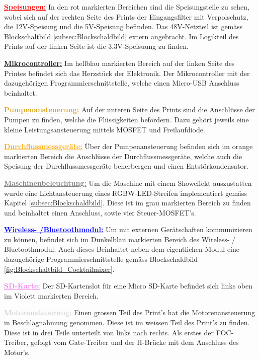 \textcolor{red}{\textbf{\underline{Speisungen:}}}
In den rot markierten Bereichen sind die Speisungsteile zu sehen, wobei sich auf der rechten Seite des Prints der Eingangsfilter mit Verpolschutz, die 12V-Speisung und die 5V-Speisung befinden. Das 48V-Netzteil ist gemäss Blockschaltbild \ref{subsec:Blockschaldbild} extern angebracht. Im Logikteil des Prints auf der linken Seite ist die 3.3V-Speisuung zu finden.

\textcolor{ProcessBlue}{\textbf{\underline{Mikrocontroller:}}}
Im hellblau markierten Bereich auf der linken Seite des Printes befindet sich das Herzstück der Elektronik. Der Mikrocontroller mit der dazugehörigen Programmierschnittstelle, welche einen Micro-USB Anschluss beinhaltet.

\textcolor{Goldenrod}{\textbf{\underline{Pumpenansteuerung:}}}
Auf der unteren Seite des Prints sind die Anschlüsse der Pumpen zu finden, welche die Flüssigkeiten befördern. Dazu gehört jeweils eine kleine Leistungsansteuerung mittels MOSFET und Freilaufdiode. 

\textcolor{orange}{\textbf{\underline{Durchflussmessgeräte:}}} Über der Pumpenansteuerung befinden sich im orange markierten Bereich die Anschlüsse der Durchflussmessgeräte, welche auch die Speisung der Durchflussmessgeräte beherbergen und einen Entstörkondensator.

\textcolor{gray}{\textbf{\underline{Maschinenbeleuchtung:}}}
Um die Maschine mit einem Showeffekt auszustatten wurde eine Lichtansteuerung eines RGBW-LED-Streifen implementiert gemäss Kapitel \ref{subsec:Blockschaldbild}. Diese ist im grau markierten Bereich zu finden und beinhaltet einen Anschluss, sowie vier Steuer-MOSFET's.

\textcolor{blue}{\textbf{\underline{Wireless- /Bluetoothmodul:}}}
Um mit externen Gerätschaften kommunizieren zu können, befindet sich im Dunkelblau markierten Bereich des Wireless- / Bluetoothmodul. Auch dieses Beinhaltet neben dem eigentlichen Modul eine dazugehörige Programmierschnittstelle gemäss Blockschaldbild \ref{fig:Blockschaltbild_Cocktailmixer}.

\textcolor{violet}{\textbf{\underline{SD-Karte:}}}
Der SD-Kartenslot für eine Micro SD-Karte befindet sich links oben im Violett markierten Bereich.


\textcolor{lightgray}{\textbf{\underline{Motoransteuerung:}}}
Einen grossen Teil des Print's hat die Motorenansteuerung in Beschlagnahmung genommen. Diese ist im weissen Teil des Print's zu finden. Diese ist in drei Teile unterteilt von links nach rechts. Als erstes der FOC-Treiber, gefolgt vom Gate-Treiber und der H-Brücke mit dem Anschluss des Motor's. 

